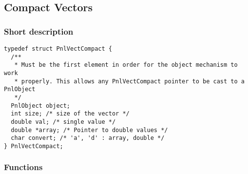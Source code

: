 \subsection{Compact Vectors}
\subsubsection{Short description}

\begin{verbatim}
typedef struct PnlVectCompact {
  /**
   * Must be the first element in order for the object mechanism to work
   * properly. This allows any PnlVectCompact pointer to be cast to a PnlObject
   */
  PnlObject object; 
  int size; /* size of the vector */
  double val; /* single value */
  double *array; /* Pointer to double values */
  char convert; /* 'a', 'd' : array, double */
} PnlVectCompact;
\end{verbatim}

\subsubsection{Functions}

